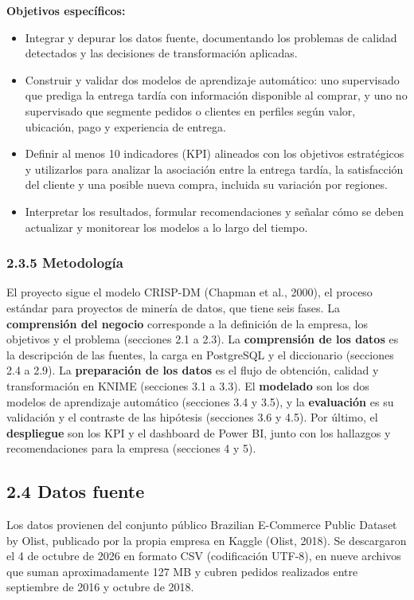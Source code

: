 \documentclass[a4paper,stu,12pt,donotrepeattitle,floatsintext]{apa7}
\begin{document}
\textbf{Objetivos específicos:}

\begin{itemize}
\item Integrar y depurar los datos fuente, documentando los problemas de calidad detectados y las decisiones de transformación aplicadas.
\item Construir y validar dos modelos de aprendizaje automático: uno supervisado que prediga la entrega tardía con información disponible al comprar, y uno no supervisado que segmente pedidos o clientes en perfiles según valor, ubicación, pago y experiencia de entrega.
\item Definir al menos 10 indicadores (KPI) alineados con los objetivos estratégicos y utilizarlos para analizar la asociación entre la entrega tardía, la satisfacción del cliente y una posible nueva compra, incluida su variación por regiones.
\item Interpretar los resultados, formular recomendaciones y señalar cómo se deben actualizar y monitorear los modelos a lo largo del tiempo.
\end{itemize}
\subsubsection{2.3.5 Metodología}
El proyecto sigue el modelo CRISP-DM (Chapman et al., 2000), el proceso estándar para proyectos de minería de datos, que tiene seis fases. La \textbf{comprensión del negocio} corresponde a la definición de la empresa, los objetivos y el problema (secciones 2.1 a 2.3). La \textbf{comprensión de los datos} es la descripción de las fuentes, la carga en PostgreSQL y el diccionario (secciones 2.4 a 2.9). La \textbf{preparación de los datos} es el flujo de obtención, calidad y transformación en KNIME (secciones 3.1 a 3.3). El \textbf{modelado} son los dos modelos de aprendizaje automático (secciones 3.4 y 3.5), y la \textbf{evaluación} es su validación y el contraste de las hipótesis (secciones 3.6 y 4.5). Por último, el \textbf{despliegue} son los KPI y el dashboard de Power BI, junto con los hallazgos y recomendaciones para la empresa (secciones 4 y 5).

\subsection{2.4 Datos fuente}
Los datos provienen del conjunto público Brazilian E-Commerce Public Dataset by Olist, publicado por la propia empresa en Kaggle (Olist, 2018). Se descargaron el 4 de octubre de 2026 en formato CSV (codificación UTF-8), en nueve archivos que suman aproximadamente 127 MB y cubren pedidos realizados entre septiembre de 2016 y octubre de 2018.
\end{document}
